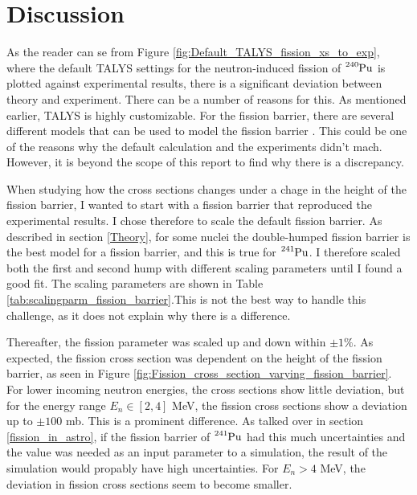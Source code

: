 \documentclass[]{article}
\begin{document}
\section{Discussion}

As the reader can se from Figure \ref{fig:Default_TALYS_fission_xs_to_exp}, where the default TALYS settings for the neutron-induced fission of $\ce{^{240}Pu}$ is plotted against experimental results, there is a significant deviation between theory and experiment. There can be a number of reasons for this. As mentioned earlier, TALYS is highly customizable. For the fission barrier, there are several different models that can be used to model the fission barrier \cite{TALYSmanual}. This could be one of the reasons why the default calculation and the experiments didn't mach. However, it is beyond the scope of this report to find why there is a discrepancy.


\par 
\vspace{3mm}

 \noindent When studying how the cross sections changes under a chage in the height of the fission barrier, I wanted to start with a fission barrier that reproduced the experimental results. I chose therefore to scale the default fission barrier. As described in section \ref{Theory}, for some nuclei the double-humped fission barrier is the best model for a fission barrier, and this is true for $\ce{^{241}Pu}$. I therefore scaled both the first and second hump with different scaling parameters until I found a good fit. The scaling parameters are shown in Table \ref{tab:scalingparm_fission_barrier}.This is not the best way to handle this challenge, as it does not explain why there is a difference.
 
 \par 
 \vspace{3mm}
 \noindent Thereafter, the fission parameter was scaled up and down within $\pm 1 \%$. As expected, the fission cross section was dependent on the height of the fission barrier, as seen in Figure \ref{fig:Fission_cross_section_varying_fission_barrier}. For lower incoming neutron energies, the cross sections show little deviation, but for the energy range $E_n \in [2,4]$ MeV, the fission cross sections show a deviation up to $\pm 100$ mb. This is a prominent difference. As talked over in section \ref{fission_in_astro}, if the fission barrier of $\ce{^{241}Pu}$ had this much uncertainties and the value was needed as an input parameter to a simulation, the result of the simulation would propably have high uncertainties. For $E_n > 4$ MeV, the deviation in fission cross sections seem to become smaller.
 
\end{document}
